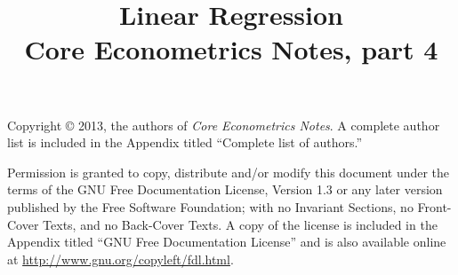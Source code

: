 \documentclass[nohyper]{tufte-handout}
\title[Linear regression]%
{Linear Regression \\
  Core Econometrics Notes, part 4}
\begin{document}
\maketitle

\bigskip\noindent%
Copyright © 2013, the authors of \textit{Core Econometrics Notes}.  A
complete author list is included in the Appendix titled ``Complete
list of authors.''

Permission is granted to copy, distribute and/or modify this document
under the terms of the GNU Free Documentation License, Version 1.3 or
any later version published by the Free Software Foundation; with no
Invariant Sections, no Front-Cover Texts, and no Back-Cover Texts.  A
copy of the license is included in the Appendix titled ``GNU Free
Documentation License'' and is also available online at
\url{http://www.gnu.org/copyleft/fdl.html}.

\tableofcontents








\end{document}
